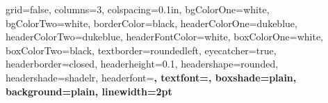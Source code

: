 \documentclass[landscape, paperwidth=42in, paperheight=36in,
fontscale=.35, margin=1in]{baposter}
\begin{document}
\begin{poster}{ 
  grid=false,
  columns=3,
  colspacing=0.1in, 
  bgColorOne=white,
  bgColorTwo=white,
  borderColor=black,
  headerColorOne=dukeblue, %
  headerColorTwo=dukeblue, %
  headerFontColor=white,
  boxColorOne=white,
  boxColorTwo=black, %
  textborder=roundedleft,
  eyecatcher=true,
  headerborder=closed,
  headerheight=0.1\textheight,
  headershape=rounded, 
  headershade=shadelr,
  headerfont=\Large\bf\textsf, %
  textfont={\setlength{\parindent}{1.5em}},
  boxshade=plain,
  background=plain,
  linewidth=2pt
  } {%
	\hspace{1.3in} 
        \setlength\fboxsep{0pt}
        \setlength\fboxrule{0.5pt}
        }
\end{poster}
\end{document}
